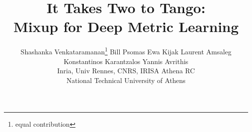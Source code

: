 \documentclass{article}
\begin{document}
\title{It Takes Two to Tango: \\ Mixup for Deep Metric Learning}

\author{Shashanka Venkataramanan\thanks{equal contribution}  \hspace{1.5em} Bill Psomas  \hspace{1.5em} Ewa Kijak \hspace{1.5em}  Laurent Amsaleg\\
\vspace{-6pt}
Konstantinos Karantzalos\hspace{1.5em} Yannis Avrithis\\
\vspace{6pt}
Inria, Univ Rennes, CNRS, IRISA \hspace{1.5em} Athena RC\\
\vspace{3pt}
National Technical University of Athens\\
}





\maketitle



\newcommand{\head}[1]{{\smallskip\noindent\textbf{#1}}}
\newcommand{\alert}[1]{{\color{red}{#1}}}
\newcommand{\sm}{\scriptsize}
\newcommand{\eq}[1]{(\ref{eq:#1})}

\newcommand{\Th}[1]{\textsc{#1}}
\newcommand{\mr}[2]{\multirow{#1}{*}{#2}}
\newcommand{\mc}[2]{\multicolumn{#1}{c}{#2}}
\newcommand{\tb}[1]{\textbf{#1}}
\newcommand{\ch}{\checkmark}

\newcommand{\red}[1]{{\color{red}{#1}}}
\newcommand{\blue}[1]{{\color{blue}{#1}}}
\newcommand{\green}[1]{\color{green}{#1}}
\newcommand{\gray}[1]{{\color{gray}{#1}}}

\newcommand{\citeme}[1]{\red{[XX]}}
\newcommand{\refme}[1]{\red{(XX)}}

\newcommand{\fig}[2][1]{\texttt{[image: fig/\#2]}}
\newcommand{\figh}[2][1]{\texttt{[image: fig/\#2]}}


\newcommand{\tran}{^\top}
\newcommand{\mtran}{^{-\top}}
\newcommand{\zcol}{\mathbf{0}}
\newcommand{\zrow}{\zcol\tran}

\newcommand{\ind}{\mathbbm{1}}
\newcommand{\expect}{\mathbb{E}}
\newcommand{\nat}{\mathbb{N}}
\newcommand{\zahl}{\mathbb{Z}}
\newcommand{\real}{\mathbb{R}}
\newcommand{\proj}{\mathbb{P}}
\newcommand{\prob}{\operatorname{P}}
\newcommand{\normal}{\mathcal{N}}
\end{document}
